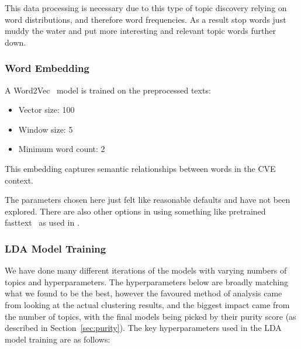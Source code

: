 \documentclass[12pt]{article}
\begin{document}
This data processing is necessary due to this type of topic discovery relying on word distributions,
and therefore word frequencies. As a result stop words just muddy the water and put more interesting
and relevant topic words further down.

\subsubsection{Word Embedding}

A Word2Vec~\cite{word2vec} model is trained on the preprocessed texts:

\begin{itemize} \item Vector size: 100 \item Window size: 5 \item Minimum word count: 2
\end{itemize}

This embedding captures semantic relationships between words in the CVE context.

The parameters chosen here just felt like reasonable defaults and have not been explored. There are
also other options in using something like pretrained fasttext~\cite{fasttext} as used in
\cite{nvd_clustering_fasttext}.


\subsubsection{LDA Model Training}

We have done many different iterations of the models with varying numbers of topics and
hyperparameters. The hyperparameters below are broadly matching what we found to be the best,
however the favoured method of analysis came from looking at the actual clustering results, and the
biggest impact came from the number of topics, with the final models being picked by their purity
score (as described in Section~\ref{sec:purity}). The key hyperparameters used in the LDA model
training are as follows:
\end{document}
